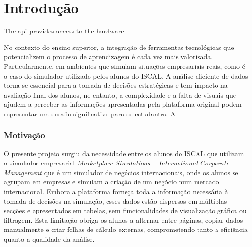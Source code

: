 



\chapter{Introdução}
\label{ch:introducao}


The \gls{api} provides access to the hardware.


No contexto do ensino superior, a integração de ferramentas tecnológicas que potencializem o processo de aprendizagem é cada vez mais valorizada. Particularmente, em ambientes que simulam situações empresariais reais, como é o caso do simulador utilizado pelos alunos do ISCAL.  A análise eficiente de dados torna-se essencial para a tomada de decisões estratégicas e tem impacto na avaliação final dos alunos, no entanto, a complexidade e a falta de visuais que ajudem a perceber as informações apresentadas pela plataforma original podem representar um desafio significativo para os estudantes. A 

\subsection{Motivação}
O presente projeto surgiu da necessidade  entre os alunos do ISCAL que utilizam o simulador empresarial \textit{Marketplace Simulations – International Corporate Management} que é um simulador de negócios internacionais, onde os alunos se agrupam em empresas e simulam a criação de um negócio num mercado internacional. Embora a plataforma forneça toda a informação necessária à tomada de decisões na simulação, esses dados estão dispersos em múltiplas secções e apresentados em tabelas, sem funcionalidades de visualização gráfica ou filtragem. Esta limitação obriga os alunos a alternar entre páginas, copiar dados manualmente e criar folhas de cálculo externas, comprometendo tanto a eficiência quanto a qualidade da análise.


